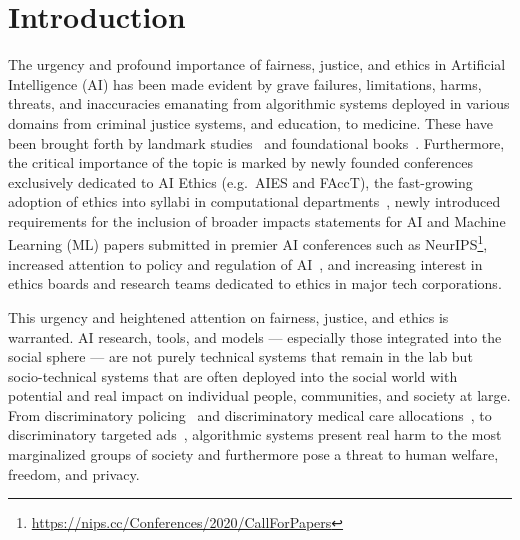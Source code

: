 \documentclass[manuscript]{acmart}
\begin{document}
\maketitle

\section{Introduction}
\label{introduction}

The urgency and profound importance of fairness, justice, and ethics in Artificial Intelligence (AI) has been made evident by grave failures, limitations, harms, threats, and inaccuracies emanating from algorithmic systems deployed in various domains from criminal justice systems, and education, to medicine. These have been brought forth by landmark studies~\cite{angwin2016machine, buolamwini2018gender,obermeyer2019dissecting} and foundational books~\cite{noble2018algorithms, o2016weapons, eubanks2018automating, pasquale2015black, gandy2021panoptic, costanza2020design, d2020data, zuboff2019age}. Furthermore, the critical importance of the topic is marked by newly founded conferences exclusively dedicated to AI Ethics (e.g.\ AIES and FAccT), the fast-growing adoption of ethics into syllabi in computational departments~\cite{fiesler2020we}, newly introduced requirements for the inclusion of broader impacts statements for AI and Machine Learning (ML) papers submitted in premier AI conferences such as NeurIPS\footnote{\url{https://nips.cc/Conferences/2020/CallForPapers}}, increased attention to policy and regulation of AI~\cite{jobin2019global}, and increasing interest in ethics boards and research teams dedicated to ethics in major tech corporations. 

This urgency and heightened attention on fairness, justice, and ethics is warranted. AI research, tools, and models --- especially those integrated into the social sphere --- are not purely technical systems that remain in the lab but socio-technical systems that are often deployed into the social world with potential and real impact on individual people, communities, and society at large. From discriminatory policing~\cite{scannell2019not,browning2020stop,lum2016predict} and discriminatory medical care allocations~\cite{obermeyer2019dissecting,vyas2020hidden,powe2020black}, to discriminatory targeted ads~\cite{speicher2018potential,ali2019discrimination,kuhn2013gender}, algorithmic systems present real harm to the most marginalized groups of society and furthermore pose a threat to human welfare, freedom, and privacy. 
\end{document}
